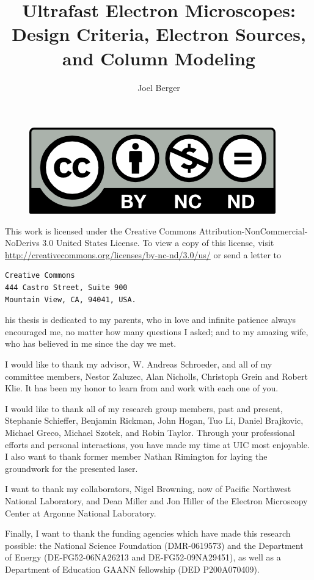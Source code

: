 \documentclass{uicthesi}
\title{Ultrafast Electron Microscopes: Design Criteria, Electron Sources, and Column Modeling}
\author{Joel Berger}
\begin{document}
\maketitle

\newpage
\begin{figure}
  \centering
  \includegraphics{by-nc-nd}
\end{figure}
This work is licensed under the Creative Commons Attribution-NonCommercial-NoDerivs 3.0 United States License.
To view a copy of this license, visit \url{http://creativecommons.org/licenses/by-nc-nd/3.0/us/} or send a letter to
\begin{verbatim}
Creative Commons
444 Castro Street, Suite 900
Mountain View, CA, 94041, USA.
\end{verbatim}


\dedication
This thesis is dedicated to my parents, who in love and infinite patience always encouraged me, no matter how many questions I asked; and to my amazing wife, who has believed in me since the day we met. 
 
\acknowledgment
I would like to thank my advisor, W. Andreas Schroeder, and all of my committee members, Nestor Zaluzec, %
Alan Nicholls, %
Christoph Grein and Robert Klie.
It has been my honor to learn from and work with each one of you.

I would like to thank all of my research group members, past and present, Stephanie Schieffer, Benjamin Rickman, John Hogan, Tuo Li, Daniel Brajkovic, Michael Greco, Michael Szotek, and Robin Taylor.
Through your professional efforts and personal interactions, you have made my time at UIC most enjoyable.
I also want to thank former member Nathan Rimington for laying the groundwork for the presented laser.

I want to thank my collaborators, Nigel Browning, now of Pacific Northwest National Laboratory, and Dean Miller and Jon Hiller of the Electron Microscopy Center at Argonne National Laboratory.

Finally, I want to thank the funding agencies which have made this research possible: 
the National Science Foundation (DMR-0619573) and the Department of Energy (DE-FG52-06NA26213 and DE-FG52-09NA29451), as well as a Department of Education GAANN fellowship (DED P200A070409).
\end{document}
